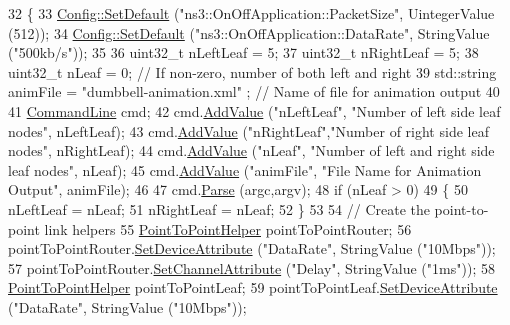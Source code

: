 \begin{DoxyCode}
32 \{
33   \hyperlink{group__config_ga2e7882df849d8ba4aaad31c934c40c06}{Config::SetDefault} (\textcolor{stringliteral}{"ns3::OnOffApplication::PacketSize"}, UintegerValue (512));
34   \hyperlink{group__config_ga2e7882df849d8ba4aaad31c934c40c06}{Config::SetDefault} (\textcolor{stringliteral}{"ns3::OnOffApplication::DataRate"}, StringValue (\textcolor{stringliteral}{"500kb/s"}));
35 
36   uint32\_t    nLeftLeaf = 5;
37   uint32\_t    nRightLeaf = 5;
38   uint32\_t    nLeaf = 0; \textcolor{comment}{// If non-zero, number of both left and right}
39   std::string animFile = \textcolor{stringliteral}{"dumbbell-animation.xml"} ;  \textcolor{comment}{// Name of file for animation output}
40 
41   \hyperlink{classns3_1_1CommandLine}{CommandLine} cmd;
42   cmd.\hyperlink{classns3_1_1CommandLine_addcfb546c7ad4c8bd0965654d55beb8e}{AddValue} (\textcolor{stringliteral}{"nLeftLeaf"}, \textcolor{stringliteral}{"Number of left side leaf nodes"}, nLeftLeaf);
43   cmd.\hyperlink{classns3_1_1CommandLine_addcfb546c7ad4c8bd0965654d55beb8e}{AddValue} (\textcolor{stringliteral}{"nRightLeaf"},\textcolor{stringliteral}{"Number of right side leaf nodes"}, nRightLeaf);
44   cmd.\hyperlink{classns3_1_1CommandLine_addcfb546c7ad4c8bd0965654d55beb8e}{AddValue} (\textcolor{stringliteral}{"nLeaf"},     \textcolor{stringliteral}{"Number of left and right side leaf nodes"}, nLeaf);
45   cmd.\hyperlink{classns3_1_1CommandLine_addcfb546c7ad4c8bd0965654d55beb8e}{AddValue} (\textcolor{stringliteral}{"animFile"},  \textcolor{stringliteral}{"File Name for Animation Output"}, animFile);
46 
47   cmd.\hyperlink{classns3_1_1CommandLine_a5c10b85b3207e5ecb48d907966923156}{Parse} (argc,argv);
48   \textcolor{keywordflow}{if} (nLeaf > 0)
49     \{
50       nLeftLeaf = nLeaf;
51       nRightLeaf = nLeaf;
52     \}
53 
54   \textcolor{comment}{// Create the point-to-point link helpers}
55   \hyperlink{classns3_1_1PointToPointHelper}{PointToPointHelper} pointToPointRouter;
56   pointToPointRouter.\hyperlink{classns3_1_1PointToPointHelper_a4577f5ab8c387e5528af2e0fbab1152e}{SetDeviceAttribute}  (\textcolor{stringliteral}{"DataRate"}, StringValue (\textcolor{stringliteral}{"10Mbps"}));
57   pointToPointRouter.\hyperlink{classns3_1_1PointToPointHelper_a6b5317fd17fb61e5a53f8d66a90b63b9}{SetChannelAttribute} (\textcolor{stringliteral}{"Delay"}, StringValue (\textcolor{stringliteral}{"1ms"}));
58   \hyperlink{classns3_1_1PointToPointHelper}{PointToPointHelper} pointToPointLeaf;
59   pointToPointLeaf.\hyperlink{classns3_1_1PointToPointHelper_a4577f5ab8c387e5528af2e0fbab1152e}{SetDeviceAttribute}    (\textcolor{stringliteral}{"DataRate"}, StringValue (\textcolor{stringliteral}{"10Mbps"}));

\end{DoxyCode}
